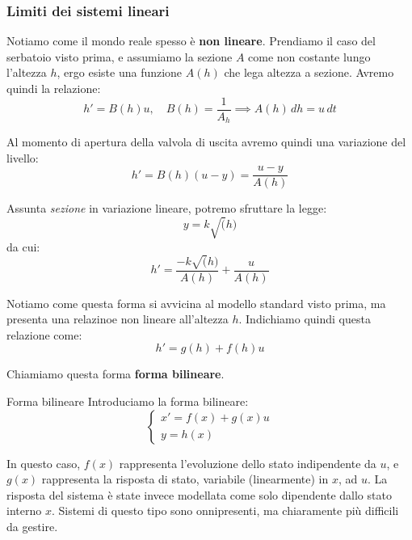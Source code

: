 \documentclass[a4paper,11pt]{article}
\begin{document}
\subsubsection{Limiti dei sistemi lineari}
Notiamo come il mondo reale spesso è \textbf{non lineare}.
Prendiamo il caso del serbatoio visto prima, e assumiamo la sezione $A$ come non costante lungo l'altezza $h$, ergo esiste una funzione $A(h)$ che lega altezza a sezione.
Avremo quindi la relazione:
$$
h' = B(h) u, \quad B(h) = \frac{1}{A_h} \implies A(h) \, dh = u \, dt
$$

Al momento di apertura della valvola di uscita avremo quindi una variazione del livello:
$$
h' = B(h)(u - y) = \frac{u - y}{A(h)}
$$

Assunta \textit{sezione} in variazione lineare, potremo sfruttare la legge:
$$
y = k\sqrt(h)
$$
da cui:
$$
h' = \frac{-k\sqrt(h)}{A(h)} + \frac{u}{A(h)}
$$

Notiamo come questa forma si avvicina al modello standard visto prima, ma presenta una relazinoe non lineare all'altezza $h$.
Indichiamo quindi questa relazione come:
$$
h' = g(h) + f(h) u
$$

Chiamiamo questa forma \textbf{forma bilineare}.
\begin{definition}{Forma bilineare}
	Introduciamo la forma bilineare:
	\[
		\begin{cases}
			x' = f(x) + g(x) u \\ 
			y = h(x)
		\end{cases}
	\]
\end{definition}

In questo caso, $f(x)$ rappresenta l'evoluzione dello stato indipendente da $u$, e $g(x)$ rappresenta la risposta di stato, variabile (linearmente) in $x$, ad $u$.
La risposta del sistema è state invece modellata come solo dipendente dallo stato interno $x$.
Sistemi di questo tipo sono onnipresenti, ma chiaramente più difficili da gestire.
\end{document}
